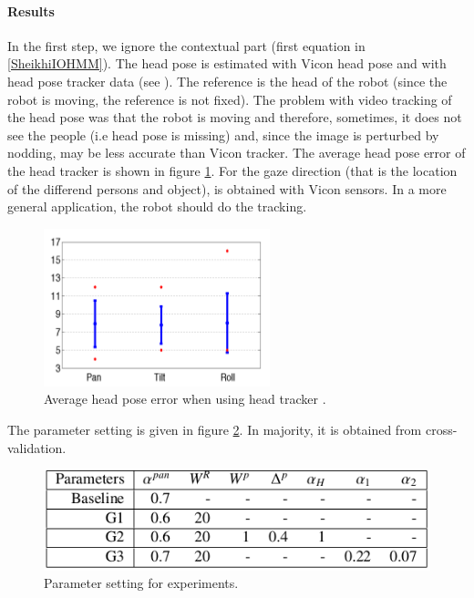 \documentclass[11pt,a4paper]{article}
\begin{document}
\paragraph{Results}
In the first step, we ignore the contextual part (first equation in \eqref{SheikhiIOHMM}). The head pose is estimated with Vicon head pose and with head pose tracker data (see \cite{Khalidov}). The reference is the head of the robot (since the robot is moving, the reference is not fixed). The problem with video tracking of the head pose was that the robot is moving and therefore, sometimes, it does not see the people (i.e head pose is missing) and, since the image is perturbed by nodding, may be less accurate than Vicon tracker. The average head pose error of the head tracker is shown in figure \ref{HeadTrackerError}. For the gaze direction (that is the location of the differend persons and object), is obtained with Vicon sensors. In a more general application, the robot should do the tracking.

\begin{figure}[!h]
\centering
\includegraphics[scale = 0.9]{./Pictures/HeadTrackerError.png}
\caption{Average head pose error when using head tracker \cite{Khalidov}. \label{HeadTrackerError}}
\end{figure}

The parameter setting is given in figure \ref{ParameterSettingSheikhi}. In majority, it is obtained from cross-validation.

\begin{figure}[!h]
\centering
\includegraphics[scale=0.5]{./Pictures/ParameterSettingSheikhi.png}
\caption{Parameter setting for experiments. \label{ParameterSettingSheikhi}}
\end{figure}
\end{document}
